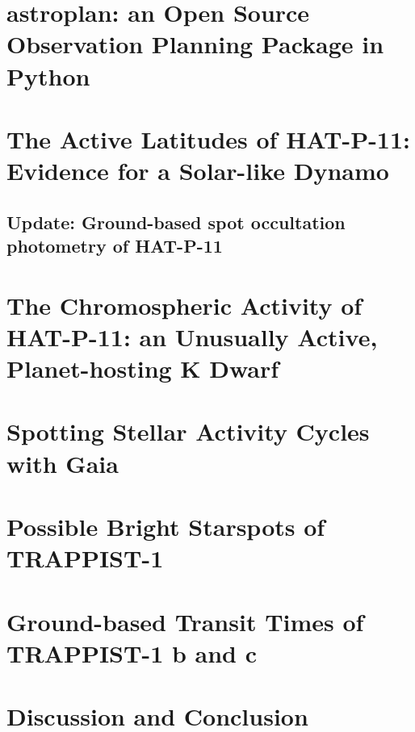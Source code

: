 \documentclass[11pt, proquest]{uwthesis}
\begin{document}
\chapter{astroplan: an Open Source Observation Planning Package in Python}



\chapter{The Active Latitudes of HAT-P-11: Evidence for a Solar-like Dynamo}



\section{Update: Ground-based spot occultation photometry of HAT-P-11}



\chapter{The Chromospheric Activity of HAT-P-11: an Unusually Active, Planet-hosting K Dwarf}



\chapter{Spotting Stellar Activity Cycles with Gaia}



\chapter{Possible Bright Starspots of TRAPPIST-1}



\chapter{Ground-based Transit Times of TRAPPIST-1 b and c}



\chapter{Discussion and Conclusion}
\end{document}

